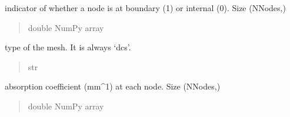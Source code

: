 \documentclass[letterpaper,10pt,english]{sphinxmanual}
\begin{document}
\begin{fulllineitems}

\begin{fulllineitems}
\label{\detokenize{_autosummary/nirfasterff.base.dcs_mesh.dcsmesh:nirfasterff.base.dcs_mesh.dcsmesh.bndvtx}}
\pysigstartsignatures
\pysigline
{}
\pysigstopsignatures
\sphinxAtStartPar
indicator of whether a node is at boundary (1) or internal (0). Size (NNodes,)
\begin{quote}\begin{description}
\sphinxAtStartPar
double NumPy array

\end{description}\end{quote}

\end{fulllineitems}


\begin{fulllineitems}
\label{\detokenize{_autosummary/nirfasterff.base.dcs_mesh.dcsmesh:nirfasterff.base.dcs_mesh.dcsmesh.type}}
\pysigstartsignatures
\pysigline
{}
\pysigstopsignatures
\sphinxAtStartPar
type of the mesh. It is always ‘dcs’.
\begin{quote}\begin{description}
\sphinxAtStartPar
str

\end{description}\end{quote}

\end{fulllineitems}


\begin{fulllineitems}
\label{\detokenize{_autosummary/nirfasterff.base.dcs_mesh.dcsmesh:nirfasterff.base.dcs_mesh.dcsmesh.mua}}
\pysigstartsignatures
\pysigline
{}
\pysigstopsignatures
\sphinxAtStartPar
absorption coefficient (mm\textasciicircum{}\sphinxhyphen{}1) at each node. Size (NNodes,)
\begin{quote}\begin{description}
\sphinxAtStartPar
double NumPy array


\end{description}
\end{quote}
\end{fulllineitems}
\end{fulllineitems}
\end{document}
